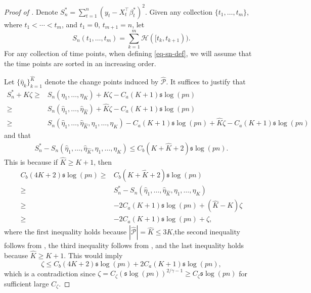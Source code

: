 \documentclass[11pt]{article}
\newcommand{\hatp}{  {\widehat  { \mathcal P }  } }
\newcommand{\s}{ { \mathfrak{s}  } }
\theoremstyle{plain}
\theoremstyle{definition}
\begin{document}
\begin{proof}[Proof of ] 
Denote $S^*_n = \sum_{t=1}^n (y_t - X_t^{\top} \beta^*_t)^2$.  Given any collection $\{t_1, \ldots, t_m\}$, where $t_1 < \cdots < t_m$, and $t_1 = 0$, $t_{m+1} = n$, let 
	\begin{equation}\label{eq-sn-def}
		S_n(t_1, \ldots, t_{m}) = \sum_{k=1}^{m}  \mathcal H([t_k, t_{k+1})) . 
	\end{equation}
	For any collection of time points, when defining \eqref{eq-sn-def}, we will assume that  the time points are sorted in an increasing order.
	
	
Let $\{ \widehat \eta_{k}\}_{k=1}^{\widehat K}$ denote the change points induced by $\widehat {\mathcal P}$.  It suffices to   justify that 
	\begin{align}
		S^*_n + K \zeta   \ge  &S_n(\eta_1,\ldots,\eta_K)   + K \zeta   - C_a ( K+1)  \s \log(pn) \label{eq:K consistency step 1} \\ 
		\ge & S_n (\widehat \eta_{1},\ldots, \widehat \eta_{\widehat K } ) +\widehat  K  \zeta   - C_a(K+1) \s \log(pn)  \label{eq:K consistency step 2} \\ 
		\ge   &   S_n ( \widehat \eta_{1},\ldots, \widehat \eta_{\widehat K } , \eta_1,\ldots,\eta_K ) - C_a(K+1) \s \log(pn) + \widehat K   \zeta     - C_a(K+1) \s \log(pn)   \label{eq:K consistency step 3}
	\end{align}
	and that 
	\begin{align}\label{eq:K consistency step 4}
		S^*_n  -S_n ( \widehat \eta_{1},\ldots, \widehat \eta_{\widehat K } , \eta_1,\ldots,\eta_K ) \le   C _b(K + \widehat{K} + 2)\s\log(pn) . 
	\end{align}
	This is because if $\widehat K \ge K+1 $, then
	\begin{align*}
		C_b (4K +2 ) \s\log(pn) \ge&  C _b(K + \widehat{K} + 2) \s\log(pn)  
		\\ \geq  & S^*_n  -S_n ( \widehat \eta_{1},\ldots, \widehat \eta_{\widehat K } , \eta_1,\ldots,\eta_K ) \\
		 \geq &   - 2  C_a  (K+1) \s \log(pn) +(\widehat K -K) \zeta  
		\\
		\ge & - 2  C_a  (K+1) \s \log(pn) +   \zeta,
	\end{align*} 
where the first inequality holds because $| \hatp|  =\widehat K\le 3K $,the second inequality follows from  , the third inequality follows from  , and the last inequality holds because $\widehat K \ge K+1 $.    This would imply 
$$\zeta\le C_b(4K+2)\s\log(pn) + 2 C_a(K+1)\s\log(pn) ,$$
which is a contradiction since $\zeta   =  C_\zeta (\s\log(pn))^{2/\gamma -1 }\ge C_\zeta \s\log(pn)$ for sufficient large $C_{\zeta}$. 


\end{proof}
\end{document}
